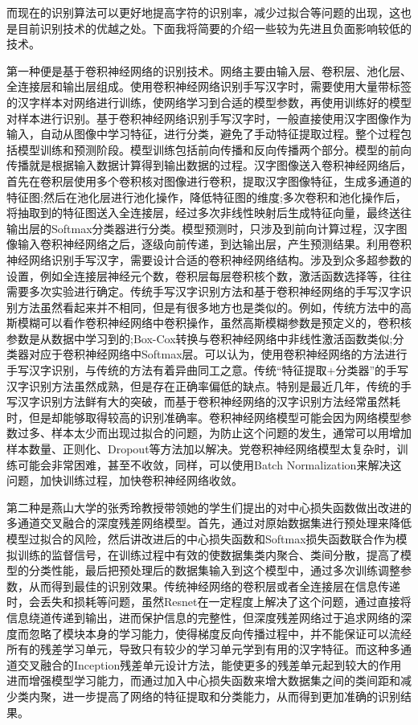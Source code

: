 \documentclass{article}
\begin{document}
而现在的识别算法可以更好地提高字符的识别率，减少过拟合等问题的出现，这也是目前识别技术的优越之处。下面我将简要的介绍一些较为先进且负面影响较低的技术。


第一种便是基于卷积神经网络的识别技术\citep{yangjie,}。网络主要由输入层、卷积层、池化层、全连接层和输出层组成。使用卷积神经网络\citep{Wang2014An,}识别手写汉字时，需要使用大量带标签的汉字样本对网络进行训练，使网络学习到合适的模型参数，再使用训练好的模型对样本进行识别。基于卷积神经网络识别手写汉字时，一般直接使用汉字图像作为输入，自动从图像中学习特征，进行分类，避免了手动特征提取过程。整个过程包括模型训练和预测阶段。模型训练包括前向传播和反向传播两个部分。模型的前向传播就是根据输入数据计算得到输出数据的过程。汉字图像送入卷积神经网络后，首先在卷积层使用多个卷积核对图像进行卷积，提取汉字图像特征，生成多通道的特征图;然后在池化层进行池化操作，降低特征图的维度;多次卷积和池化操作后，将抽取到的特征图送入全连接层，经过多次非线性映射后生成特征向量，最终送往输出层的Softmax分类器进行分类\citep{zhangqiuyued,}。模型预测时，只涉及到前向计算过程，汉字图像输入卷积神经网络之后，逐级向前传递，到达输出层，产生预测结果。利用卷积神经网络识别手写汉字，需要设计合适的卷积神经网络结构。涉及到众多超参数的设置，例如全连接层神经元个数，卷积层每层卷积核个数，激活函数选择等，往往需要多次实验进行确定。传统手写汉字识别方法和基于卷积神经网络的手写汉字识别方法虽然看起来并不相同，但是有很多地方也是类似的。例如，传统方法中的高斯模糊可以看作卷积神经网络中卷积操作，虽然高斯模糊参数是预定义的，卷积核参数是从数据中学习到的;Box-Cox转换与卷积神经网络中非线性激活函数类似;分类器对应于卷积神经网络中Softmax层。可以认为，使用卷积神经网络的方法进行手写汉字识别，与传统的方法有着异曲同工之意。传统“特征提取+分类器”的手写汉字识别方法虽然成熟，但是存在正确率偏低的缺点。特别是最近几年，传统的手写汉字识别方法鲜有大的突破，而基于卷积神经网络的汉字识别方法经常虽然耗时，但是却能够取得较高的识别准确率。\citep{zhubo,}卷积神经网络模型可能会因为网络模型参数过多、样本太少而出现过拟合的问题，为防止这个问题的发生，通常可以用增加样本数量、正则化、Dropout等方法加以解决。党卷积神经网络模型太复杂时，训练可能会非常困难，甚至不收敛，同样，可以使用Batch Normalization来解决这问题，加快训练过程，加快卷积神经网络收敛。

第二种是燕山大学的张秀玲教授带领她的学生们提出的对中心损失函数做出改进的多通道交叉融合的深度残差网络模型\citep{zhangxiuling,}。首先，通过对原始数据集进行预处理来降低模型过拟合的风险，然后讲改进后的中心损失函数和Softmax损失函数联合作为模拟训练的监督信号，在训练过程中有效的使数据集类内聚合、类间分散，提高了模型的分类性能，最后把预处理后的数据集输入到这个模型中，通过多次训练调整参数，从而得到最佳的识别效果。传统神经网络的卷积层或者全连接层在信息传递时，会丢失和损耗等问题，虽然Resnet在一定程度上解决了这个问题，通过直接将信息绕道传递到输出，进而保护信息的完整性，但深度残差网络过于追求网络的深度而忽略了模块本身的学习能力，使得梯度反向传播过程中，并不能保证可以流经所有的残差学习单元，导致只有较少的学习单元学到有用的汉字特征。而这种多通道交叉融合的Inception残差单元设计方法，能使更多的残差单元起到较大的作用进而增强模型学习能力，而通过加入中心损失函数来增大数据集之间的类间距和减少类内聚，进一步提高了网络的特征提取和分类能力，从而得到更加准确的识别结果。
\end{document}
